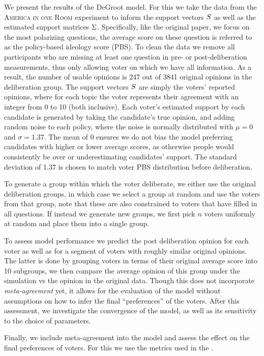 We present the results of the DeGroot model. For this we take the data from the
\textsc{America in one Room} experiment to inform the support vectors
$S$ as well as the estimated support matrices $\Sigma$.
Specifically, like the original paper, we focus on the most polarizing
questions, the average score on these question is referred to as the
policy-based ideology score (PBS). To clean the data we remove all participants
who are missing at least one question in pre- or post-deliberation
measurements, thus only allowing voter on which we have all information. As a
result, the number of usable opinions is 247 out of 3841 original opinions in
the deliberation group. The support vectors $S$ are simply the voters'
reported opinions, where for each topic the voter represents their agreement
with an integer from 0 to 10 (both inclusive). Each voter's estimated support
by each candidate is generated by taking the candidate's true opinion, and
adding random noise to each policy, where the noise is normally distributed
with $\mu = 0$ and $\sigma = 1.37$. The mean of 0 ensures we do not bias the
model preferring candidates with higher or lower average scores, as otherwise
people would consistently be over or underestimating candidates' support. The
standard deviation of 1.37 is chosen to match voter PBS distribution before
deliberation.

To generate a group within which the voter deliberate, we either use the original deliberation groups, in which case we select a group at random and use the voters from that group, note that these are also constrained to voters that have filled in all questions. If instead we generate new groups, we first pick $n$ voters uniformly at random and place them into a single group.

To assess model performance we predict the post deliberation opinion for each
voter as well as for a segment of voters with roughly similar original
opinions. The latter is done by grouping voters in terms of their original
average score into 10 subgroups, we then compare the average opinion of this
group under the simulation vs the opinion in the original data. Though this
does not incorporate \textit{meta-agreement} yet, it allows for the evaluation
of the model without assumptions on how to infer the final ``preferences'' of
the voters. After this assessment, we investigate the convergence of the model,
as well as its sensitivity to the choice of parameters.

Finally, we include meta-agreement into the model and assess the effect on the
final preferences of voters. For this we use the metrics used in the .

